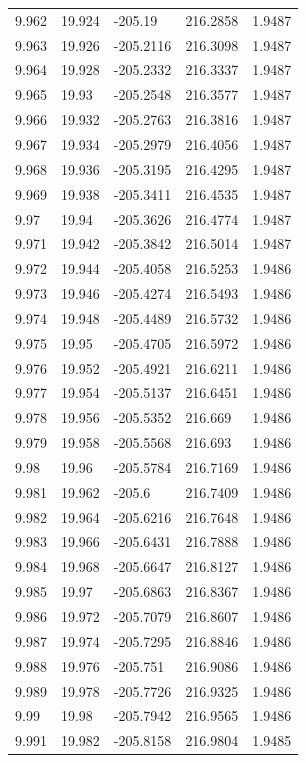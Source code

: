 \begin{tabular}{lllll}
9.962 & 19.924 & -205.19 & 216.2858 & 1.9487 \\
9.963 & 19.926 & -205.2116 & 216.3098 & 1.9487 \\
9.964 & 19.928 & -205.2332 & 216.3337 & 1.9487 \\
9.965 & 19.93 & -205.2548 & 216.3577 & 1.9487 \\
9.966 & 19.932 & -205.2763 & 216.3816 & 1.9487 \\
9.967 & 19.934 & -205.2979 & 216.4056 & 1.9487 \\
9.968 & 19.936 & -205.3195 & 216.4295 & 1.9487 \\
9.969 & 19.938 & -205.3411 & 216.4535 & 1.9487 \\
9.97 & 19.94 & -205.3626 & 216.4774 & 1.9487 \\
9.971 & 19.942 & -205.3842 & 216.5014 & 1.9487 \\
9.972 & 19.944 & -205.4058 & 216.5253 & 1.9486 \\
9.973 & 19.946 & -205.4274 & 216.5493 & 1.9486 \\
9.974 & 19.948 & -205.4489 & 216.5732 & 1.9486 \\
9.975 & 19.95 & -205.4705 & 216.5972 & 1.9486 \\
9.976 & 19.952 & -205.4921 & 216.6211 & 1.9486 \\
9.977 & 19.954 & -205.5137 & 216.6451 & 1.9486 \\
9.978 & 19.956 & -205.5352 & 216.669 & 1.9486 \\
9.979 & 19.958 & -205.5568 & 216.693 & 1.9486 \\
9.98 & 19.96 & -205.5784 & 216.7169 & 1.9486 \\
9.981 & 19.962 & -205.6 & 216.7409 & 1.9486 \\
9.982 & 19.964 & -205.6216 & 216.7648 & 1.9486 \\
9.983 & 19.966 & -205.6431 & 216.7888 & 1.9486 \\
9.984 & 19.968 & -205.6647 & 216.8127 & 1.9486 \\
9.985 & 19.97 & -205.6863 & 216.8367 & 1.9486 \\
9.986 & 19.972 & -205.7079 & 216.8607 & 1.9486 \\
9.987 & 19.974 & -205.7295 & 216.8846 & 1.9486 \\
9.988 & 19.976 & -205.751 & 216.9086 & 1.9486 \\
9.989 & 19.978 & -205.7726 & 216.9325 & 1.9486 \\
9.99 & 19.98 & -205.7942 & 216.9565 & 1.9486 \\
9.991 & 19.982 & -205.8158 & 216.9804 & 1.9485 \\

\end{tabular}
